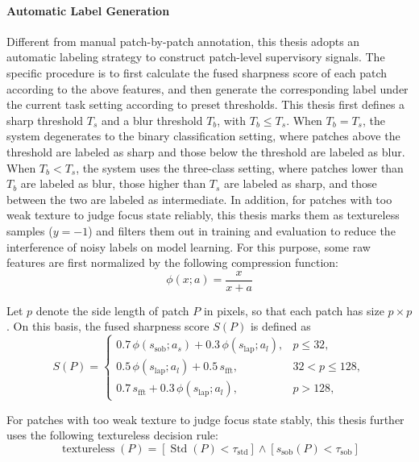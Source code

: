 \paragraph{Automatic Label Generation}
\par Different from manual patch-by-patch annotation, this thesis adopts an
automatic labeling strategy to construct patch-level supervisory signals. The
specific procedure is to first calculate the fused sharpness score of each patch
according to the above features, and then generate the corresponding label under
the current task setting according to preset thresholds. This thesis first
defines a sharp threshold $T_s$ and a blur threshold $T_b$, with $T_b\le T_s$.
When $T_b=T_s$, the system degenerates to the binary classification setting,
where patches above the threshold are labeled as sharp and those below the
threshold are labeled as blur. When $T_b<T_s$, the system uses the three-class
setting, where patches lower than $T_b$ are labeled as blur, those higher than
$T_s$ are labeled as sharp, and those between the two are labeled as
intermediate. In addition, for patches with too weak texture to judge focus
state reliably, this thesis marks them as textureless samples ($y=-1$) and
filters them out in training and evaluation to reduce the interference of noisy
labels on model learning. For this purpose, some raw features are first
normalized by the following compression function:
\begin{equation}
    \phi(x;a)=\frac{x}{x+a}
    \label{eq:score-squash}
\end{equation}
\par Let $p$ denote the side length of patch $P$ in pixels, so that each patch
has size $p\times p$. On this basis, the fused sharpness score $S(P)$ is defined
as
\begin{equation}
    S(P)=
    \begin{cases}
        0.7\,\phi(s_{\mathrm{sob}};a_s)+0.3\,\phi(s_{\mathrm{lap}};a_l), & p\le 32,     \\
        0.5\,\phi(s_{\mathrm{lap}};a_l)+0.5\,s_{\mathrm{fft}},           & 32<p\le 128, \\
        0.7\,s_{\mathrm{fft}}+0.3\,\phi(s_{\mathrm{lap}};a_l),           & p>128,
    \end{cases}
    \label{eq:fused-score}
\end{equation}
\par For patches with too weak texture to judge focus state stably, this thesis
further uses the following textureless decision rule:
\begin{equation}
    \operatorname{textureless}(P)=
    \left[\operatorname{Std}(P)<\tau_{\mathrm{std}}\right]
    \land
    \left[s_{\mathrm{sob}}(P)<\tau_{\mathrm{sob}}\right]
    \label{eq:textureless}
\end{equation}
